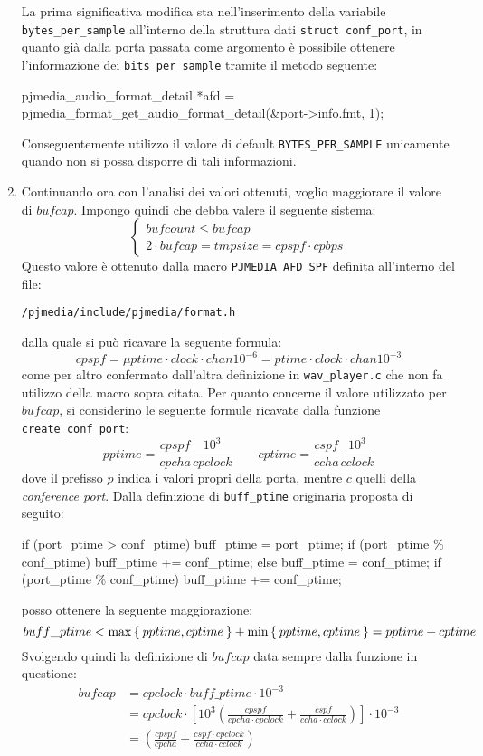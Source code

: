 \begin{enumerate}
	La prima significativa modifica sta nell'inserimento della variabile 
	\texttt{\small bytes\_per\_sample} all'interno della struttura dati 
	\texttt{\small struct conf\_port}, in quanto già dalla porta passata come
	argomento è possibile ottenere l'informazione dei \texttt{\small bits\_per\_sample}
	tramite il metodo seguente:
	\begin{clang}
	pjmedia_audio_format_detail *afd = pjmedia_format_get_audio_format_detail(&port->info.fmt, 1);
	\end{clang} 
	Conseguentemente utilizzo il valore di default \texttt{\small BYTES\_PER\_SAMPLE}
	unicamente quando non si possa disporre di tali informazioni.
\item 	Continuando ora con l'analisi dei valori ottenuti, voglio maggiorare
	il valore di $bufcap$. Impongo quindi che debba valere il seguente 
	sistema:
	\[\begin{cases}
	bufcount \leq bufcap\\
	2\cdot bufcap = tmpsize = cpspf \cdot cpbps 
	\end{cases}\]
	Questo valore è ottenuto dalla macro \texttt{\small PJMEDIA\_AFD\_SPF}
	definita all'interno del file:
	\begin{center}
	\texttt{\small \PJA/pjmedia/include/pjmedia/format.h}
	\end{center}
	dalla quale si può ricavare la seguente formula:
	\[cpspf = \mu ptime \cdot clock \cdot chan 10^{-6} = ptime \cdot clock \cdot chan 10^{-3}\]
	come per altro confermato dall'altra definizione in \texttt{\small wav\_player.c}
	che non fa utilizzo della macro sopra citata. 
	Per quanto concerne il valore utilizzato per $bufcap$, si considerino
	le seguente formule ricavate dalla funzione \texttt{\small create\_conf\_port}:
\[pptime=\frac{cpspf}{cpcha}\frac{10^3}{cpclock}\qquad cptime = \frac{cspf}{ccha}\frac{10^3}{cclock}\]
	dove il prefisso $p$ indica i valori propri della porta, mentre $c$
	quelli della \textit{conference port}. Dalla definizione di \texttt{\small buff\_ptime}
	originaria proposta di seguito:
	\begin{clang}
	if (port_ptime > conf_ptime) {
	  buff_ptime = port_ptime;
	  if (port_ptime \% conf_ptime)
	     buff_ptime += conf_ptime;
	} else {
	  buff_ptime = conf_ptime;
	  if (port_ptime \% conf_ptime)
	     buff_ptime += conf_ptime;
	}
	\end{clang}
	posso ottenere la seguente maggiorazione:
	\[buff\_ptime < \max\Set{pptime,cptime}+\min\Set{pptime,cptime} = pptime + cptime\]
	Svolgendo quindi la definizione di $bufcap$ data sempre dalla funzione in
	questione:
	\[\begin{split}
	bufcap &= cpclock \cdot buff\_ptime \cdot 10^{-3}\\
	       &= cpclock\cdot \left[10^3\left(\frac{cpspf}{cpcha\cdot cpclock} + \frac{cspf}{ccha\cdot cclock}  \right)\right]\cdot 10^{-3}\\
	       &= \left(\frac{cpspf}{cpcha} + \frac{cspf\cdot cpclock}{ccha\cdot cclock} \right)
	\end{split}\]
	

\end{enumerate}
